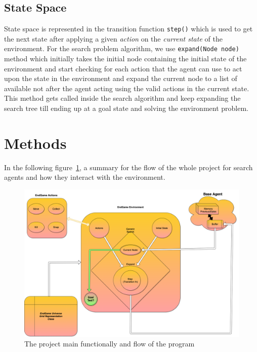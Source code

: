 \documentclass{article}
\newcommand{\code}[1]{\colorbox{codegray}{\texttt{#1}}}
\begin{document}
\subsection{State Space}
State space is represented in the transition function \code{step()} which is used to get the next state after applying a given \textit{action} on the \textit{current state} of the environment. For the search problem algorithm, we use \code{expand(Node node)} method which initially takes the initial node containing the initial state of the environment and start checking for each action that the agent can use to act upon the state in the environment and expand the current node to a list of available not after the agent acting using the valid actions in the current state. This method gets called inside the search algorithm and keep expanding the search tree till ending up at a goal state and solving the environment problem.


\section{Methods}
In the following figure~\ref{fig:flow}, a summary for the flow of the whole project for search agents and how they interact with the environment.

\begin{figure}[!hpt]
  \centering
  \includegraphics[width=\linewidth]{figures/EndGame.png}
  \caption{The project main functionally and flow of the program}
  \label{fig:flow}
\end{figure}
\end{document}
